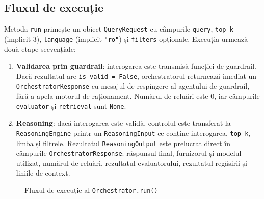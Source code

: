 \documentclass[12pt, a4paper, oneside, romanian]{teza-upb}
\begin{document}
\subsection{Fluxul de execuție}

Metoda \texttt{run} primește un obiect \texttt{QueryRequest} cu câmpurile \texttt{query}, \texttt{top\_k} (implicit 3), \texttt{language} (implicit \texttt{"ro"}) și \texttt{filters} opționale. Execuția urmează două etape secvențiale:

\begin{enumerate}
    \item \textbf{Validarea prin guardrail}: interogarea este transmisă funcției de guardrail. Dacă rezultatul are \texttt{is\_valid = False}, orchestratorul returnează imediat un \texttt{OrchestratorResponse} cu mesajul de respingere al agentului de guardrail, fără a apela motorul de raționament. Numărul de reluări este 0, iar câmpurile \texttt{evaluator} și \texttt{retrieval} sunt \texttt{None}.
    \item \textbf{Reasoning}: dacă interogarea este validă, controlul este transferat la  \texttt{ReasoningEngine} printr-un \texttt{ReasoningInput} ce conține interogarea, \texttt{top\_k}, limba și filtrele. Rezultatul \texttt{ReasoningOutput} este prelucrat direct în câmpurile \texttt{OrchestratorResponse}: răspunsul final, furnizorul și modelul utilizat, numărul de reluări, rezultatul evaluatorului, rezultatul regăsirii și liniile de context.
\end{enumerate}


\begin{figure}[H]
\centering
{}
\caption{Fluxul de execuție al \texttt{Orchestrator.run()}}
\label{fig:orchestrator}
\end{figure}
\end{document}
